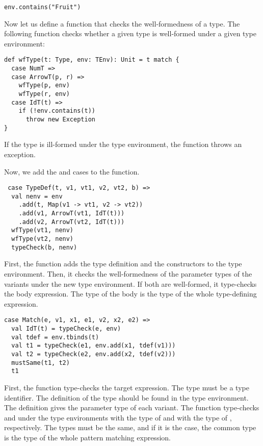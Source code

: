\begin{verbatim}
env.contains("Fruit")
\end{verbatim}

Now let us define a function that checks the well-formedness of a type.
The following  function checks whether a given type is well-formed
under a given type environment:

\begin{verbatim}
def wfType(t: Type, env: TEnv): Unit = t match {
  case NumT =>
  case ArrowT(p, r) =>
    wfType(p, env)
    wfType(r, env)
  case IdT(t) =>
    if (!env.contains(t))
      throw new Exception
}
\end{verbatim}

If the type is ill-formed under the type environment, the function throws
an exception.

Now, we add the  and  cases to the  function.

\begin{verbatim}
 case TypeDef(t, v1, vt1, v2, vt2, b) =>
  val nenv = env
    .add(t, Map(v1 -> vt1, v2 -> vt2))
    .add(v1, ArrowT(vt1, IdT(t)))
    .add(v2, ArrowT(vt2, IdT(t)))
  wfType(vt1, nenv)
  wfType(vt2, nenv)
  typeCheck(b, nenv)
\end{verbatim}

First, the function adds the type definition and the constructors to the type
environment. Then, it checks the well-formedness of the parameter types of the
variants under the new type environment. If both are well-formed,
it type-checks the body expression. The type of the body is the type of the
whole type-defining expression.

\begin{verbatim}
case Match(e, v1, x1, e1, v2, x2, e2) =>
  val IdT(t) = typeCheck(e, env)
  val tdef = env.tbinds(t)
  val t1 = typeCheck(e1, env.add(x1, tdef(v1)))
  val t2 = typeCheck(e2, env.add(x2, tdef(v2)))
  mustSame(t1, t2)
  t1
\end{verbatim}

First, the function type-checks the target expression. The type must be
a type identifier. The definition of the type should be found in the type
environment. The definition gives the parameter type of each variant. The
function type-checks  and  under the type environments with the
type of  and with the type of , respectively.
The types must be the same, and if it is the case, the common
type is the type of the whole pattern matching expression.

